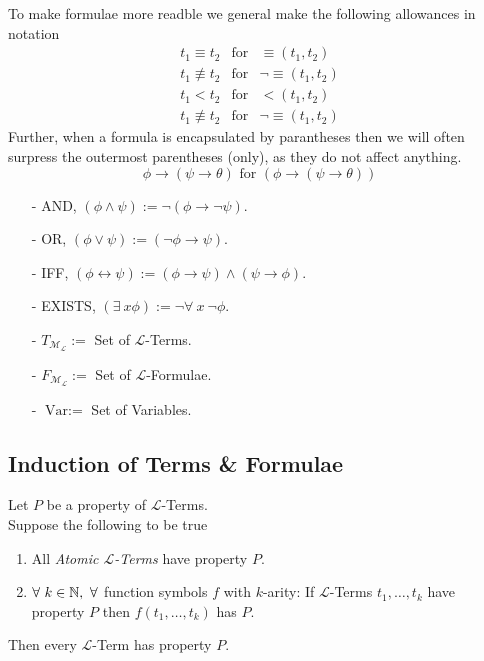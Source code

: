 \documentclass[11pt,a4paper]{article}
\begin{document}
To make formulae more readble we general make the following allowances in notation
\[\begin{array}{rcl}
t_1\equiv t_2&\text{for}&\equiv(t_1,t_2)\\
t_1\not\equiv t_2&\text{for}&\neg\equiv(t_1,t_2)\\
t_1< t_2&\text{for}&<(t_1,t_2)\\
t_1\not\equiv t_2&\text{for}&\neg\equiv(t_1,t_2)
\end{array}\]
Further, when a formula is encapsulated by parantheses then we will often surpress the outermost parentheses (only), as they do not affect anything.
$$\phi\longrightarrow(\psi\longrightarrow\theta)\text{ for }(\phi\longrightarrow(\psi\longrightarrow\theta))$$

\begin{itemize}
	\item[-] AND, $(\phi\wedge\psi):=\neg(\phi\longrightarrow\neg\psi)$.
	\item[-] OR, $(\phi\vee\psi):=(\neg\phi\longrightarrow\psi)$.
	\item[-] IFF, $(\phi\longleftrightarrow\psi):=(\phi\longrightarrow\psi)\wedge(\psi\longrightarrow\phi)$.
	\item[-] EXISTS, $(\exists\ x\phi):=\neg\forall\ x\ \neg\phi$.
\end{itemize}

\begin{itemize}
	\item[-] $T_\mathcal{M_L}:=$ Set of $\mathcal{L}$-Terms.
	\item[-] $F_\mathcal{M_L}:=$ Set of $\mathcal{L}$-Formulae.
	\item[-] $\text{Var}:=$ Set of Variables.
\end{itemize}


\subsection{Induction of Terms \& Formulae}

Let $P$ be a property of $\mathcal{L}$-Terms.\\
Suppose the following to be true
\begin{enumerate}
	\item All \textit{Atomic $\mathcal{L}$-Terms} have property $P$.
	\item $\forall\ k\in\mathbb{N},\ \forall$ function symbols $f$ with $k$-arity:
	If $\mathcal{L}$-Terms $t_1,\dots,t_k$ have property $P$ then $f(t_1,\dots,t_k)$ has $P$.
\end{enumerate}
Then every $\mathcal{L}$-Term has property $P$.\\
\end{document}
